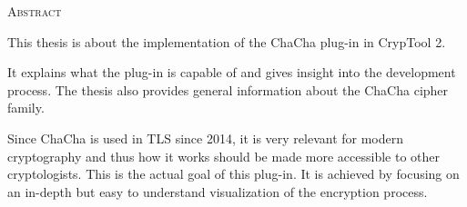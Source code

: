 
\begin{center}
  \textsc{Abstract}
\end{center}

\noindent
This thesis is about the implementation of the ChaCha plug-in in CrypTool 2.

\medskip
\noindent
It explains what the plug-in is capable of and gives insight into the development process. The thesis also provides general information about the ChaCha cipher family.

\medskip
\noindent
Since ChaCha is used in TLS since 2014, it is very relevant for modern cryptography and thus how it works should be made more accessible to other cryptologists. This is the actual goal of this plug-in. It is achieved by focusing on an in-depth but easy to understand visualization of  the encryption process.

